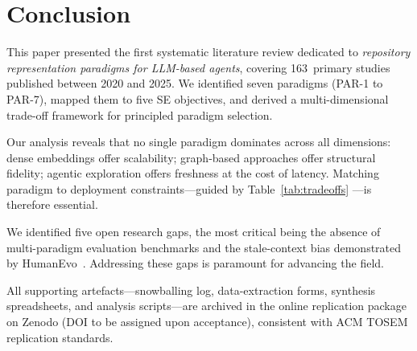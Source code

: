 
\section{Conclusion}
\label{sec:conclusion}

This paper presented the first systematic literature review dedicated to
\emph{repository representation paradigms for LLM-based agents}, covering
163~primary studies published between 2020 and 2025.  We identified seven
paradigms (PAR-1 to PAR-7), mapped them to five SE objectives, and derived a
multi-dimensional trade-off framework for principled paradigm selection.

Our analysis reveals that no single paradigm dominates across all dimensions:
dense embeddings offer scalability; graph-based approaches offer structural
fidelity; agentic exploration offers freshness at the cost of latency.
Matching paradigm to deployment constraints—guided by Table~\ref{tab:tradeoffs}
—is therefore essential.

We identified five open research gaps, the most critical being the absence of
multi-paradigm evaluation benchmarks and the stale-context bias demonstrated
by HumanEvo~\cite{zheng2025humanevo}.  Addressing these gaps is paramount for
advancing the field.

All supporting artefacts—snowballing log, data-extraction forms, synthesis
spreadsheets, and analysis scripts—are archived in the online replication
package on Zenodo (DOI to be assigned upon acceptance), consistent with ACM
TOSEM replication standards.
